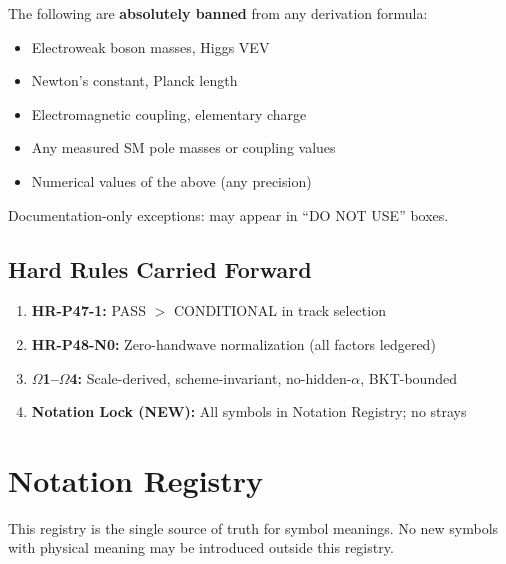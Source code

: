 \documentclass[11pt,a4paper]{article}
\begin{document}
\begin{tcolorbox}[colback=red!5!white,colframe=red!60!black,title=\textbf{FORBIDDEN INPUTS (DO NOT USE)}]
The following are \textbf{absolutely banned} from any derivation formula:
\begin{itemize}[nosep]
\item Electroweak boson masses, Higgs VEV
\item Newton's constant, Planck length
\item Electromagnetic coupling, elementary charge
\item Any measured SM pole masses or coupling values
\item Numerical values of the above (any precision)
\end{itemize}
Documentation-only exceptions: may appear in ``DO NOT USE'' boxes.
\end{tcolorbox}

\subsection{Hard Rules Carried Forward}
\label{subsec:hard-rules}

\begin{enumerate}
\item \textbf{HR-P47-1:} PASS $>$ CONDITIONAL in track selection
\item \textbf{HR-P48-N0:} Zero-handwave normalization (all factors ledgered)
\item \textbf{$\Omega$1--$\Omega$4:} Scale-derived, scheme-invariant, no-hidden-$\alpha$, BKT-bounded
\item \textbf{Notation Lock (NEW):} All symbols in Notation Registry; no strays
\end{enumerate}



\section{Notation Registry}
\label{sec:notation}

\begin{tcolorbox}[colback=yellow!5!white,colframe=yellow!60!black,title=\textbf{NOTATION REGISTRY (AUTHORITATIVE)}]
This registry is the single source of truth for symbol meanings. No new symbols
with physical meaning may be introduced outside this registry.
\end{tcolorbox}
\end{document}
